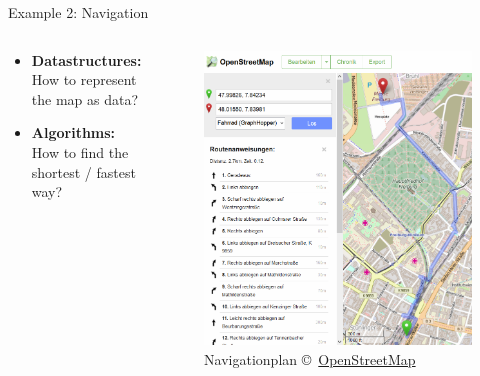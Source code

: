 \begin{frame}{Example 2: Navigation}
  \begin{columns}
    \begin{column}{0.55\textwidth}
      \begin{itemize}
        \item<2-|handout:1>
          \textbf{Datastructures:} How to represent the map as data?
        \item<3-|handout:1>
          \textbf{Algorithms:} How to find the shortest / fastest way?
      \end{itemize}
    \end{column}%
    \begin{column}{0.45\textwidth}
      \begin{figure}[!h]
        \includegraphics[width=\textwidth]
          {Images/Introduction/OpenStreetmap.png}
        \caption{Navigationplan \copyright\,%
          \href{http://openstreetmap.org/}{OpenStreetMap}%
        }%
        \label{fig:openstreetmap}
      \end{figure}
    \end{column}
  \end{columns}
\end{frame}

